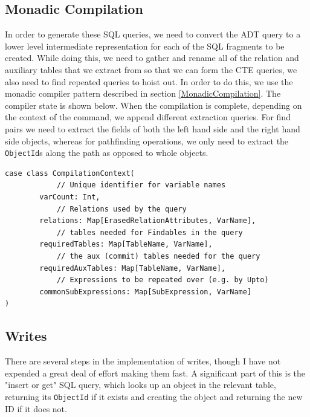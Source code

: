 \documentclass[12pt,a4paper,twoside,openright]{report}
\newcommand\codeName[1]{\texttt{#1}}
\renewcommand{\baselinestretch}{1.1}    %
\begin{document}
\begin{framed}
\end{framed}
	\subsection{Monadic Compilation}
	In order to generate these SQL queries, we need to convert the ADT query to a lower level intermediate representation for each of the SQL fragments to be created. While doing this, we need to gather and rename all of the relation and auxiliary tables that we extract from so that we can form the CTE queries, we also need to find repeated queries to hoist out. In order to do this, we use the monadic compiler pattern described in section \ref{MonadicCompilation}. The compiler state is shown below. When the compilation is complete, depending on the context of the command, we append different extraction queries. For find pairs we need to extract the fields of both the left hand side and the right hand side objects, whereas for pathfinding operations, we only need to extract the \codeName{ObjectId}s along the path as opposed to whole  objects.
	
\renewcommand{\baselinestretch}{0.8}
\begin{framed}
	\begin{verbatim}
case class CompilationContext(
            // Unique identifier for variable names
        varCount: Int,
            // Relations used by the query
        relations: Map[ErasedRelationAttributes, VarName], 
            // tables needed for Findables in the query
        requiredTables: Map[TableName, VarName],
            // the aux (commit) tables needed for the query
        requiredAuxTables: Map[TableName, VarName],
            // Expressions to be repeated over (e.g. by Upto)
        commonSubExpressions: Map[SubExpression, VarName]
)

	\end{verbatim}
\end{framed}
\renewcommand{\baselinestretch}{1.1}

	\subsection{Writes}
	There are several steps in the implementation of writes, though I have not expended  a great deal of effort making them fast. A significant part of this is the "insert or get" SQL query, which looks up an object in the relevant table, returning its \codeName{ObjectId} if it exists and creating the object and returning the new ID if it does not.
	
\end{document}

